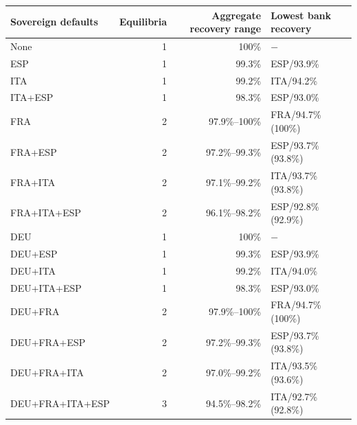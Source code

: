 \begin{tabular*}{\textwidth}{@{\extracolsep{\fill}}lrrl@{}}
\toprule
Sovereign defaults & Equilibria & Aggregate recovery range & Lowest bank recovery \\
\midrule
None & 1 & 100\% & $-$ \\
ESP & 1 & 99.3\% & ESP/93.9\% \\
ITA & 1 & 99.2\% & ITA/94.2\% \\
ITA+ESP & 1 & 98.3\% & ESP/93.0\% \\
FRA & 2 & 97.9\%--100\% & FRA/94.7\% (100\%) \\
FRA+ESP & 2 & 97.2\%--99.3\% & ESP/93.7\% (93.8\%) \\
FRA+ITA & 2 & 97.1\%--99.2\% & ITA/93.7\% (93.8\%) \\
FRA+ITA+ESP & 2 & 96.1\%--98.2\% & ESP/92.8\% (92.9\%) \\
DEU & 1 & 100\% & $-$ \\
DEU+ESP & 1 & 99.3\% & ESP/93.9\% \\
DEU+ITA & 1 & 99.2\% & ITA/94.0\% \\
DEU+ITA+ESP & 1 & 98.3\% & ESP/93.0\% \\
DEU+FRA & 2 & 97.9\%--100\% & FRA/94.7\% (100\%) \\
DEU+FRA+ESP & 2 & 97.2\%--99.3\% & ESP/93.7\% (93.8\%) \\
DEU+FRA+ITA & 2 & 97.0\%--99.2\% & ITA/93.5\% (93.6\%) \\
DEU+FRA+ITA+ESP & 3 & 94.5\%--98.2\% & ITA/92.7\% (92.8\%) \\
\bottomrule
\end{tabular*}
